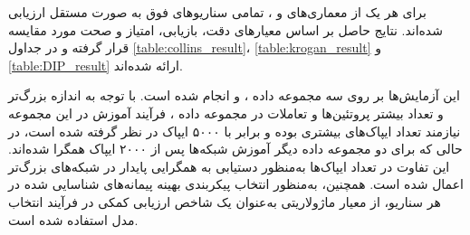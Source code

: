 برای هر یک از معماری‌های  و ، تمامی سناریو‌های فوق به‌ صورت مستقل ارزیابی شده‌اند. نتایج حاصل بر اساس معیارهای دقت، بازیابی، امتیاز  و صحت مورد مقایسه قرار گرفته و در جداول \ref{table:collins_result}، \ref{table:krogan_result} و \ref{table:DIP_result} ارائه شده‌اند.

این آزمایش‌ها بر روی سه مجموعه داده ،  و  انجام شده است. با توجه به اندازه بزرگ‌تر و تعداد بیشتر پروتئین‌ها و تعاملات در مجموعه‌ داده ، فرآیند آموزش در این مجموعه نیازمند تعداد ایپاک‌های بیشتری بوده و برابر با ۵۰۰۰ ایپاک در نظر گرفته شده است، در حالی که برای دو مجموعه‌ داده دیگر آموزش شبکه‌ها پس از ۲۰۰۰ ایپاک همگرا شده‌اند. این تفاوت در تعداد ایپاک‌ها به‌منظور دستیابی به همگرایی پایدار در شبکه‌های بزرگ‌تر اعمال شده است. همچنین، به‌منظور انتخاب پیکربندی بهینه پیمانه‌های شناسایی‌ شده در هر سناریو، از معیار ماژولاریتی به‌عنوان یک شاخص ارزیابی کمکی در فرآیند انتخاب مدل استفاده شده است.

